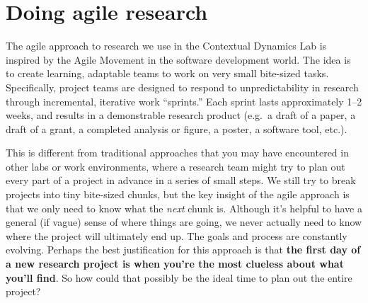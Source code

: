 \documentclass{tufte-book} %
\begin{document}
\section{Doing agile research}
 The
agile approach to research we use in the Contextual Dynamics Lab is
inspired by the Agile Movement in the software development world.  The
idea is to create learning, adaptable teams to work on very small
bite-sized tasks.  Specifically, project teams are designed to respond
to unpredictability in research through incremental, iterative work
``sprints.''  Each sprint lasts approximately 1--2 weeks, and results
in a demonstrable research product (e.g.\ a draft of a paper, a draft
of a grant, a completed analysis or figure, a poster, a software tool,
etc.).

This is different from traditional approaches that you may have
encountered in other labs or work environments, where a research team
might try to plan out every part of a project in advance in a series
of small steps.  We still try to break projects into tiny bite-sized
chunks, but the key insight of the agile approach is that we only need
to know what the \textit{next} chunk is.  Although it's helpful to
have a general (if vague) sense of where things are going, we never
actually need to know where the project will ultimately end up.  The
goals and process are constantly evolving.  Perhaps the best
justification for this approach is that \textbf{the first day of a new
  research project is when you're the most clueless about what you'll
  find}.  So how could that possibly be the ideal time to plan out the
entire project?
\end{document}
